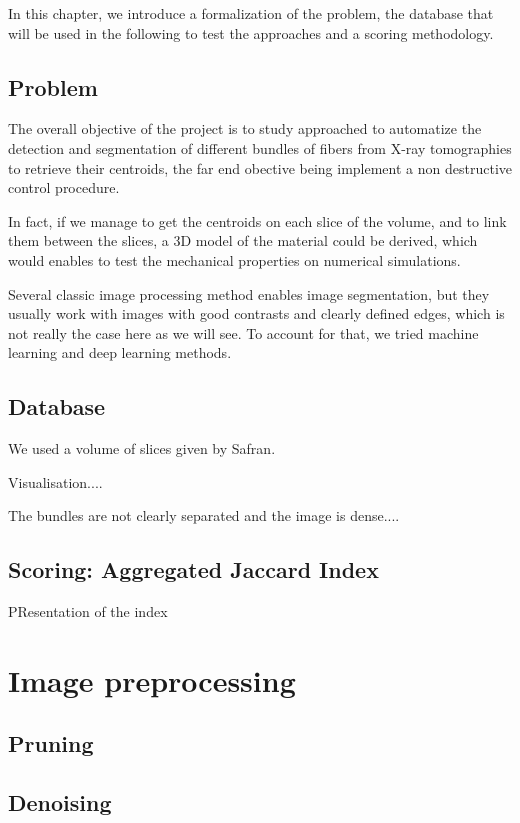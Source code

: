 \documentclass{report}
\begin{document}
In this chapter, we introduce a formalization of the problem, the database that will be used in the following to test the approaches and a scoring methodology.

\section{Problem}

The overall objective of the project is to study approached to automatize the detection and segmentation of different bundles of fibers from X-ray tomographies to retrieve their centroids, the far end obective being implement a non destructive control procedure.  

In fact, if we manage to get the centroids on each slice of the volume, and to link them between the slices, a 3D model of the material could be derived, which would enables to test the mechanical properties on numerical simulations.

Several classic image processing method enables image segmentation, but they usually work with images with good contrasts and clearly defined edges, which is not really the case here as we will see. To account for that, we tried machine learning and deep learning methods.

\section{Database}

We used a volume of slices given by Safran.

Visualisation....

The bundles are not clearly separated and the image is dense....

\section{Scoring: Aggregated Jaccard Index}

PResentation of the index

\chapter{Image preprocessing}
\section{Pruning}
\section{Denoising}
\end{document}
